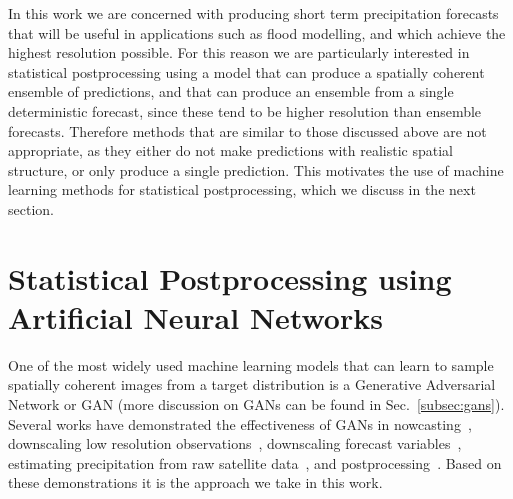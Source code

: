\documentclass[../main.tex]{subfiles}
\begin{document}
In this work we are concerned with producing short term precipitation forecasts that will be useful in applications such as flood modelling, and which achieve the highest resolution possible. For this reason we are particularly interested in statistical postprocessing using a model that can produce a spatially coherent ensemble of predictions, and that can produce an ensemble from a single deterministic forecast, since these tend to be higher resolution than ensemble forecasts. Therefore methods that are similar to those discussed above are not appropriate, as they either do not make predictions with realistic spatial structure, or only produce a single prediction. This motivates the use of machine learning methods for statistical postprocessing, which we discuss in the next section.

\section{Statistical Postprocessing using Artificial Neural Networks}

One of the most widely used machine learning models that can learn to sample spatially coherent images from a target distribution is a Generative Adversarial Network or GAN (more discussion on GANs can be found in Sec.~\ref{subsec:gans}). Several works have demonstrated the effectiveness of GANs in nowcasting~\citep{ravuri_skilful_2021}, downscaling low resolution observations~\citep{leinonen_stochastic_2020}, downscaling forecast variables~\citep{harris_generative_2022, price_increasing_2022}, estimating precipitation from raw satellite data~\citep{hayatbini_conditional_2019}, and postprocessing~\citep{duncan_generative_2022, jeong_correcting_2023, brecht_computing_2023, hess_physically_2022, yang_improving_2023}. Based on these demonstrations it is the approach we take in this work. 
\end{document}
